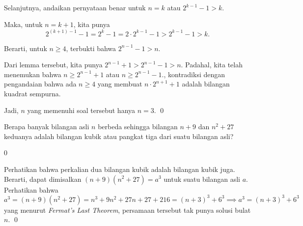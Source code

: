 \documentclass[11pt]{scrartcl}
\begin{document}
\begin{soalbaru}
\begin{solusi}
\begin{lemmarev}
\begin{buktilemma}
			Selanjutnya, andaikan pernyataan benar untuk $n=k$ atau $2^{k-1}-1 > k$.
			
			Maka, untuk $n=k+1$, kita punya 
			$$2^{(k+1)-1}-1=2^k-1=2 \cdot 2^{k-1} -1 > 2^{k-1}-1 > k.$$
			
			Berarti, untuk $n \ge 4$, terbukti bahwa $2^{n-1}-1 > n$.
			\end{buktilemma}
			\end{lemmarev}
			
			Dari lemma tersebut, kita punya $2^{n-1}+1 > 2^{n-1}-1 > n$. Padahal, kita telah menemukan bahwa $n \ge 2^{n-1}+1$ atau $n \ge 2^{n-1}-1$., kontradiksi dengan pengandaian bahwa ada $n \ge 4$ yang membuat $n \cdot 2^{n+1} +1$ adalah bilangan kuadrat sempurna.
			
			Jadi, $n$ yang memenuhi soal tersebut hanya $n=3$. \qed
		\end{solusi}
	\end{soalbaru}
\vspace{20pt}
	\begin{soalbaru}
		Berapa banyak bilangan asli $n$ berbeda sehingga bilangan $n+9$ dan $n^2+27$ keduanya adalah bilangan kubik atau pangkat tiga dari suatu bilangan asli?
		
		\begin{jawaban}
				0
				\end{jawaban}
				\begin{solusi}
				Perhatikan bahwa perkalian dua bilangan kubik adalah bilangan kubik juga. Berarti, dapat dimisalkan $(n+9)(n^2+27)=a^3$ untuk suatu bilangan asli $a$. Perhatikan bahwa $a^3=(n+9)(n^2+27)=n^3+9n^2+27n+27+216=(n+3)^3+6^3 \implies a^3=(n+3)^3+6^3$ yang menurut \textit{Fermat's Last Theorem}, persamaan tersebut tak punya solusi bulat $n$. \qed
				\end{solusi}
	\end{soalbaru}
\end{document}
